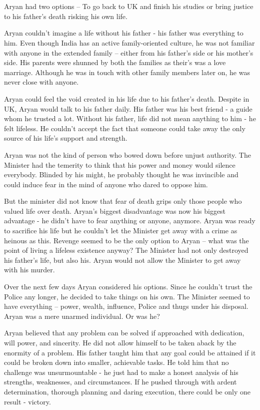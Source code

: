 \chapter{}

Aryan had two options – To go back to UK and finish his studies or bring justice
to his father's death risking his own life.

Aryan couldn't imagine a life without his father - his father was everything to
him. Even though India has an active family-oriented culture, he was not
familiar with anyone in the extended family – either from his father's side or
his mother's side. His parents were shunned by both the families as their's was
a love marriage. Although he was in touch with other family members later on, he
was never close with anyone.

Aryan could feel the void created in his life due to his father's death. Despite
in UK, Aryan would talk to his father daily. His father was his best friend - a
guide whom he trusted a lot. Without his father, life did not mean anything to
him - he felt lifeless. He couldn't accept the fact that someone could take away
the only source of his life's support and strength.

Aryan was not the kind of person who bowed down before unjust authority. The
Minister had the temerity to think that his power and money would silence
everybody. Blinded by his might, he probably thought he was invincible and could
induce fear in the mind of anyone who dared to oppose him.

But the minister did not know that fear of death grips only those people who
valued life over death. Aryan's biggest disadvantage was now his biggest
advantage - he didn't have to fear anything or anyone, anymore. Aryan was ready
to sacrifice his life but he couldn't let the Minister get away with a crime as
heinous as this. Revenge seemed to be the only option to Aryan – what was the
point of living a lifeless existence anyway? The Minister had not only destroyed
his father's life, but also his. Aryan would not allow the Minister to get away
with his murder.

Over the next few days Aryan considered his options. Since he couldn't trust the
Police any longer, he decided to take things on his own. The Minister seemed to
have everything – power, wealth, influence, Police and thugs under his disposal.
Aryan was a mere unarmed individual. Or was he?

Aryan believed that any problem can be solved if approached with dedication,
will power, and sincerity. He did not allow himself to be taken aback by the
enormity of a problem. His father taught him that any goal could be attained if
it could be broken down into smaller, achievable tasks. He told him that no
challenge was unsurmountable - he just had to make a honest analysis of his
strengths, weaknesses, and circumstances. If he pushed through with ardent
determination, thorough planning and daring execution, there could be only one
result - victory.

